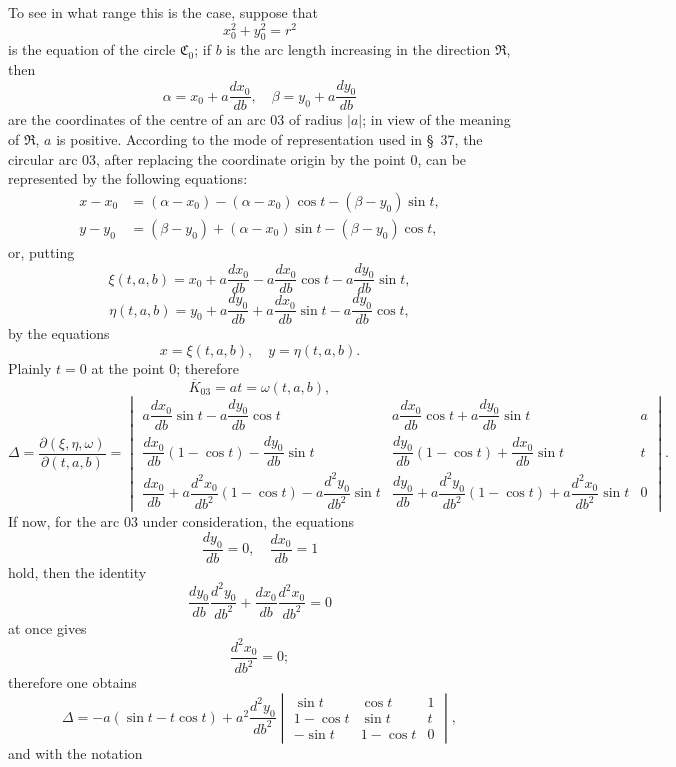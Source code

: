 \documentclass[11pt,a4paper,leqno]{article}
\begin{document}
To see in what range this is the case, suppose that
\[
x_0^2+y_0^2=r^2
\]
is the equation of the circle $\mathfrak{C}_0$; if $b$ is the arc length increasing in the direction $\mathfrak{R}$, then
\[
\alpha=x_0+a\frac{dx_0}{db},\quad \beta=y_0+a\frac{dy_0}{db}
\]
are the coordinates of the centre of an arc 03 of radius $|a|$; in view of the meaning of $\mathfrak{R}$, $a$ is positive. According to the mode of representation used in \S~37, the circular arc 03, after replacing the coordinate origin by the point 0, can be represented by the following equations:
\[
\begin{aligned}
x-x_0&=(\alpha-x_0)-(\alpha-x_0)\cos t-(\beta-y_0)\sin t,\\
y-y_0&=(\beta-y_0)+(\alpha-x_0)\sin t-(\beta-y_0)\cos t,
\end{aligned}
\]
or, putting
\[
\xi(t,a,b)=x_0+a\frac{dx_0}{db}-a\frac{dx_0}{db}\cos t-a\frac{dy_0}{db}\sin t,
\]
\[
\eta(t,a,b)=y_0+a\frac{dy_0}{db}+a\frac{dx_0}{db}\sin t-a\frac{dy_0}{db}\cos t,
\]
by the equations
\[
x=\xi(t,a,b),\quad y=\eta(t,a,b).
\]
Plainly $t=0$ at the point 0; therefore
\[
\overline{K}_{03}=at=\omega(t,a,b),
\]
\begingroup
\setlength{\arraycolsep}{1pt}
\[
\Delta=\frac{\partial(\xi,\eta,\omega)}{\partial(t,a,b)}=
\begin{vmatrix}
 a\dfrac{dx_0}{db}\sin t-a\dfrac{dy_0}{db}\cos t & a\dfrac{dx_0}{db}\cos t+a\dfrac{dy_0}{db}\sin t & a\\[1.0ex]
 \dfrac{dx_0}{db}(1-\cos t)-\dfrac{dy_0}{db}\sin t & \dfrac{dy_0}{db}(1-\cos t)+\dfrac{dx_0}{db}\sin t & t\\[1.0ex]
 \dfrac{dx_0}{db}+a\dfrac{d^2x_0}{db^2}(1-\cos t)-a\dfrac{d^2y_0}{db^2}\sin t & \dfrac{dy_0}{db}+a\dfrac{d^2y_0}{db^2}(1-\cos t)+a\dfrac{d^2x_0}{db^2}\sin t & 0
\end{vmatrix}.
\]
\endgroup
If now, for the arc 03 under consideration, the equations
\begin{equation}\tag{30}
\frac{dy_0}{db}=0,\quad \frac{dx_0}{db}=1
\end{equation}
hold, then the identity
\[
\frac{dy_0}{db}\frac{d^2y_0}{db^2}+\frac{dx_0}{db}\frac{d^2x_0}{db^2}=0
\]
at once gives
\[
\frac{d^2x_0}{db^2}=0;
\]
therefore one obtains
\[
\Delta=-a(\sin t-t\cos t)+a^2\frac{d^2y_0}{db^2}\begin{vmatrix}
\sin t&\cos t&1\\
1-\cos t&\sin t&t\\
-\sin t&1-\cos t&0
\end{vmatrix},
\]
and with the notation
\end{document}
